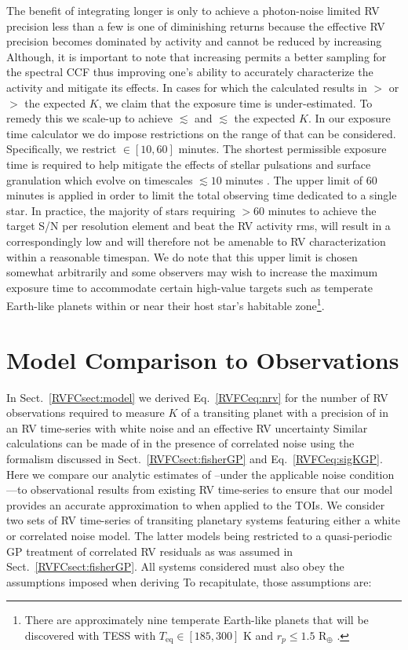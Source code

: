 The benefit of integrating longer is only to achieve a photon-noise
limited RV precision less than a few \sigact{,} is one of diminishing returns because the effective RV precision
becomes dominated by activity and cannot be reduced by increasing  Although, it is important to note that
increasing \texp{} permits a better sampling for the spectral CCF thus improving one's ability to accurately
characterize the activity and mitigate its effects. In cases for which
the calculated \texp{} results in \sigRV{} $>$ \sigact{} or
$>$ the expected $K$, we claim that the exposure time is under-estimated. To remedy this we
scale-up \texp{} to achieve \sigRV{} $\lesssim$ \sigact{} and $\lesssim$ the expected $K$.
In our exposure time calculator 
we do impose restrictions on the range of \texp{} that can be considered. Specifically, we restrict
\texp{} $\in [10,60]$ minutes. The shortest permissible exposure time is required to help mitigate
the effects of stellar pulsations and surface granulation which evolve on timescales $\lesssim 10$ minutes
\citep{lovis05, dumusque11}.
The upper limit of 60 minutes is applied in order to limit the total observing time dedicated to a single star.
In practice, the majority of stars requiring $>60$ minutes to achieve the target S/N per resolution element and
beat the RV activity rms,
will result in a correspondingly low \sigK{} and will therefore not be amenable to RV 
characterization within a reasonable timespan.
We do note that this upper limit is chosen somewhat arbitrarily and some observers may wish to increase the
maximum exposure time 
to accommodate certain high-value targets such as temperate Earth-like planets within or
near their host star's habitable zone\footnote{There are approximately nine temperate Earth-like planets
  that will be discovered
  with TESS with $T_{\text{eq}} \in [185,300]$ K and $r_p \leq 1.5$ R$_{\oplus}$ .}.


\section{Model Comparison to Observations}  \label{RVFCsect:accuracy}
In Sect.~\ref{RVFCsect:model} we derived Eq.~\ref{RVFCeq:nrv} for the number of RV observations required to measure
$K$ of a transiting planet with a precision of \sigK{} in an RV time-series with white noise and an
effective RV uncertainty  Similar calculations can be made of \sigK{(}\nrv{)} in the presence of
correlated noise using the formalism discussed in Sect.~\ref{RVFCsect:fisherGP} and Eq.~\ref{RVFCeq:sigKGP}. 
Here we compare our analytic estimates of \nrv{-}--under the applicable noise condition---to
observational results from existing RV time-series to ensure that our model provides
an accurate approximation to \nrv{} when applied to the TOIs. We consider two sets of RV time-series
of transiting planetary systems featuring either a white or correlated noise model. The latter models being
restricted to a quasi-periodic GP treatment of correlated RV residuals as was assumed in Sect.~\ref{RVFCsect:fisherGP}.
All systems considered must also obey the
assumptions imposed when deriving  To recapitulate, those assumptions are:

